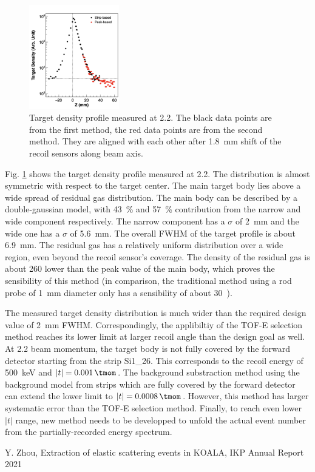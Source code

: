 \documentclass[fleqn,twocolumn,a4paper]{ikpar}
\begin{document}
\begin{figure}[htbp]
  \centering
	\includegraphics[width=0.35\textwidth]{./target_density_result.png}
  \caption{Target density profile measured at \SI{2.2}{\momentum}. The black
    data points are from the first method, the red data points are from the
    second method. They are aligned with each other after \SI{1.8}{\mm} shift of
    the recoil sensors along beam axis.}
  \label{fig:target_density_result}
\end{figure}

\par
\medskip

Fig. \ref{fig:target_density_result} shows the target density profile measured at
\SI{2.2}{\momentum}.
The distribution is almost symmetric with respect to the target center.
The main target body lies above a wide spread of residual gas distribution.
The main body can be described by a double-gaussian model, with
\SI{43}{\percent} and \SI{57}{\percent} contribution from the narrow and wide
component respectively.
The narrow component has a $\sigma$ of \SI{2}{mm} and the wide one has a $\sigma$ of \SI{5.6}{mm}.
The overall FWHM of the target profile is about \SI{6.9}{mm}.
The residual gas has a relatively uniform distribution over a wide region, even
beyond the recoil sensor's coverage.
The density of the residual gas is about 260 lower than the peak value of the
main body, which proves the sensibility of this method (in comparison, the traditional
method using a rod probe of \SI{1}{\mm} diameter only has a sensibility of about
\SI{30}).

\par
\medskip

The measured target density distribution is much wider than the required design value
of \SI{2}{\mm} FWHM.
Correspondingly, the applibiltiy of the TOF-E selection method reaches its lower
limit at larger recoil angle than the design goal as well.
At \SI{2.2}{\momentum} beam momentum, the target body is not fully covered by
the forward detector starting from the strip Si1\_26.
This corresponds to the recoil energy of \SI{500}{\keV} and $|t| = \SI{0.001}{\tmom}$.
The background substraction method using the background model from strips which
are fully covered by the forward detector can extend the lower limit to $|t| = \SI{0.0008}{\tmom}$.
However, this method has larger systematic error than the TOF-E selection method.
Finally, to reach even lower $|t|$ range, new method needs to be developped to unfold the
actual event number from the partially-recorded energy spectrum.

\par
\medskip

\begin{thebibliography}{99}
 Y. Zhou, Extraction of elastic scattering events in KOALA, IKP Annual Report 2021
\end{thebibliography}
\end{document}
